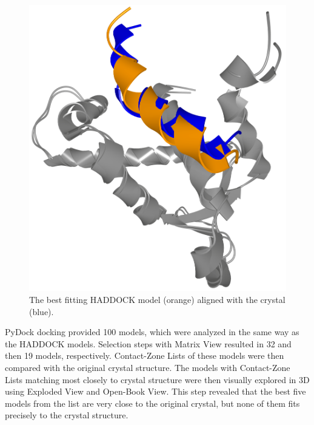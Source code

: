 \documentclass[twocolumn]{bmcart}%
\def\OpBook {Open-Book View\xspace}
\def\ExpView {Exploded View\xspace}
\def\MatView {Matrix View\xspace}
\def\CoZoLists{Contact-Zone Lists\xspace}
\begin{document}
\begin{figure}[ht]
  \centering
  \includegraphics[width=0.62\columnwidth]{images/figure17.png}
  \caption{The best fitting HADDOCK model (orange) aligned with the crystal (blue).}
  \label{fig:MukEF_selection_3_best_pair}
\end{figure} 

PyDock docking provided 100 models, which were analyzed in the same way as the HADDOCK models. 
Selection steps with \MatView resulted in 32 and then 19 models, respectively. 
\CoZoLists of these models were then compared with the original crystal structure.
The models with \CoZoLists matching most closely to crystal structure were then visually explored in 3D using \ExpView and \OpBook.
This step revealed that the best five models from the list are very close to the original crystal, but none of them fits precisely to the crystal structure.
\end{document}
